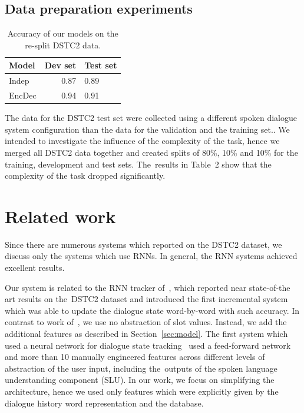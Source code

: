 \documentclass{itatnew}
\begin{document}
\subsection{Data preparation experiments}
\label{sec:split}

\begin{table}
\vspace{-0.20em}
\begin{center}
\begin{tabular}{l@{\quad}rll}
\hline
\multicolumn{1}{l}{\rule{0pt}{12pt}
                   Model}&\multicolumn{1}{l}{Dev set}&\multicolumn{2}{l}{Test set}\\[2pt]
\hline\rule{0pt}{12pt}
Indep  &   0.87 & 0.89 \\
EncDec &   0.94 & 0.91 \\
\hline
\end{tabular}
\caption{Accuracy of our models on the re-split DSTC2 data.}
\vspace{-2em}
\end{center}
\label{tabsplit}
\end{table}

The data for the DSTC2 test set were collected using a different spoken dialogue system configuration than the data for the validation and the training set.\cite{henderson2014second}.
We intended to investigate the influence of the complexity of the task, hence we merged all DSTC2 data together and created splits of 80\%, 10\% and 10\% for the training, development and test sets.
The~results in Table~2 show that the complexity of the task dropped significantly.


\section{Related work}\label{sec:related}
Since there are numerous systems which reported on the DSTC2 dataset, we discuss only the systems which use RNNs.
In general, the RNN systems achieved excellent results.

Our system is related to the RNN tracker of~\citet{zilka2015incremental},
which reported near state-of-the art results on the~DSTC2 dataset and introduced the first incremental system which was able to update the dialogue state word-by-word with such accuracy.
In contrast to work of~\citet{zilka2015incremental}, we use no abstraction of slot values. 
Instead, we add the additional features as described in Section~\ref{sec:model}.
The first system which used a neural network for dialogue state tracking~\cite{henderson2013deep} used a feed-forward network and more than 10 manually engineered features across different levels of abstraction of the user input, including the~outputs of the spoken language understanding component (SLU).
In our work, we focus on simplifying the architecture, hence we used only features which were explicitly given by the dialogue history word representation and the database.
\end{document}
